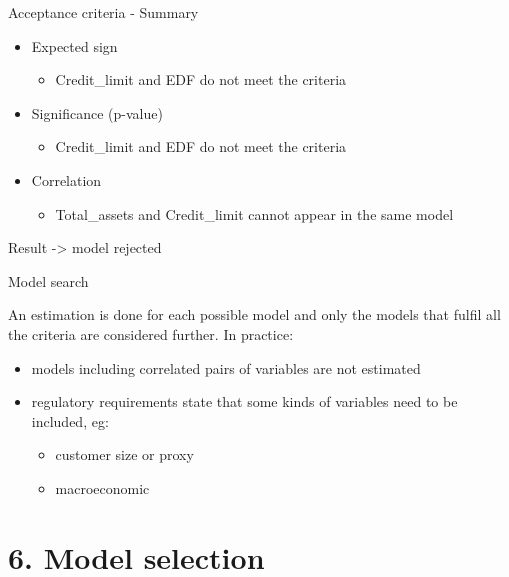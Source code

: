 \documentclass[9pt,ignorenonframetext,]{beamer}
\providecommand{\tightlist}{%
  \setlength{\itemsep}{0pt}\setlength{\parskip}{0pt}}
\begin{document}
\begin{frame}{Acceptance criteria - Summary}

\begin{itemize}
\tightlist
\item
  Expected sign

  \begin{itemize}
  \tightlist
  \item
    Credit\_limit and EDF do not meet the criteria
  \end{itemize}
\item
  Significance (p-value)

  \begin{itemize}
  \tightlist
  \item
    Credit\_limit and EDF do not meet the criteria
  \end{itemize}
\item
  Correlation

  \begin{itemize}
  \tightlist
  \item
    Total\_assets and Credit\_limit cannot appear in the same model
  \end{itemize}
\end{itemize}

Result -\textgreater{} model rejected

\end{frame}

\begin{frame}{Model search}

An estimation is done for each possible model and only the models that
fulfil all the criteria are considered further. In practice:

\begin{itemize}
\tightlist
\item
  models including correlated pairs of variables are not estimated
\item
  regulatory requirements state that some kinds of variables need to be
  included, eg:

  \begin{itemize}
  \tightlist
  \item
    customer size or proxy
  \item
    macroeconomic
  \end{itemize}
\end{itemize}

\end{frame}

\section{6. Model selection}\label{model-selection}
\end{document}
